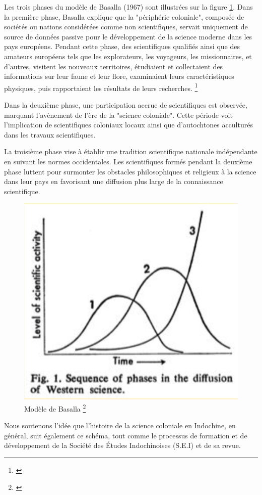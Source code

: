 Les trois phases du modèle de Basalla (1967) sont illustrées sur la figure \ref{fig:ball_model}. Dans la première phase, Basalla explique que la "périphérie coloniale", composée de sociétés ou nations considérées comme non scientifiques, servait uniquement de source de données passive pour le développement de la science moderne dans les pays européens. Pendant cette phase, des scientifiques qualifiés ainsi que des amateurs européens tels que les explorateurs, les voyageurs, les missionnaires, et d'autres, visitent les nouveaux territoires, étudiaient et collectaient des informations sur leur faune et leur flore, examinaient leurs caractéristiques physiques, puis rapportaient les résultats de leurs recherches. \footnote{\cite{ball}} 

Dans la deuxième phase, une participation accrue de scientifiques est observée, marquant l'avènement de l'ère de la "science coloniale". Cette période voit l'implication de scientifiques coloniaux locaux ainsi que d'autochtones acculturés dans les travaux scientifiques.

La troisième phase vise à établir une tradition scientifique nationale indépendante en suivant les normes occidentales. Les scientifiques formés pendant la deuxième phase luttent pour surmonter les obstacles philosophiques et religieux à la science dans leur pays en favorisant une diffusion plus large de la connaissance scientifique.

\begin{figure}[H] %
    \centering
    \includegraphics[width=0.5\linewidth]{img/ball's model.PNG}
    \caption[]{Modèle de Basalla \footnote{\cite{ball}} }
    \label{fig:ball_model}
\end{figure}

Nous soutenons l'idée que l'histoire de la science coloniale en Indochine, en général, suit également ce schéma, tout comme le processus de formation et de développement de la Société des Études Indochinoises (S.E.I) et de sa revue.

